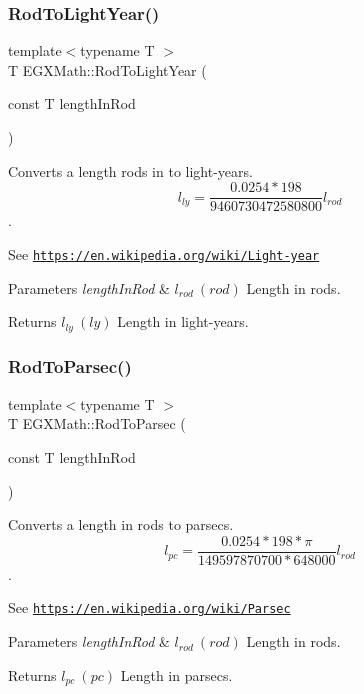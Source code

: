 \subsubsection{\texorpdfstring{Rod\+To\+Light\+Year()}{RodToLightYear()}}
{\footnotesize\ttfamily template$<$typename T $>$ \\
T E\+G\+X\+Math\+::\+Rod\+To\+Light\+Year (\begin{DoxyParamCaption}\item[{const T}]{length\+In\+Rod }\end{DoxyParamCaption})}



Converts a length rods in to light-\/years. \[ l_{ly}=\frac{0.0254 * 198}{9460730472580800} l_{rod} \]. 

See \href{https://en.wikipedia.org/wiki/Light-year}{\tt https\+://en.\+wikipedia.\+org/wiki/\+Light-\/year} 
\begin{DoxyParams}{Parameters}
{\em length\+In\+Rod} & $ l_{rod}\ (rod)$ Length in rods. \\
\hline
\end{DoxyParams}
\begin{DoxyReturn}{Returns}
$ l_{ly}\ (ly)$ Length in light-\/years. 
\end{DoxyReturn}
\mbox{\label{group___e_g_x_math-_conversions-_length_conversions-_surveyors-_rod-_astronomical_ga720b170a8c3243d0f7d5be0c70381cb2}} 
\subsubsection{\texorpdfstring{Rod\+To\+Parsec()}{RodToParsec()}}
{\footnotesize\ttfamily template$<$typename T $>$ \\
T E\+G\+X\+Math\+::\+Rod\+To\+Parsec (\begin{DoxyParamCaption}\item[{const T}]{length\+In\+Rod }\end{DoxyParamCaption})}



Converts a length in rods to parsecs. \[ l_{pc}=\frac{0.0254 * 198 * \pi}{149597870700 * 648000} l_{rod} \]. 

See \href{https://en.wikipedia.org/wiki/Parsec}{\tt https\+://en.\+wikipedia.\+org/wiki/\+Parsec} 
\begin{DoxyParams}{Parameters}
{\em length\+In\+Rod} & $ l_{rod}\ (rod)$ Length in rods. \\
\hline
\end{DoxyParams}
\begin{DoxyReturn}{Returns}
$ l_{pc}\ (pc)$ Length in parsecs. 
\end{DoxyReturn}

